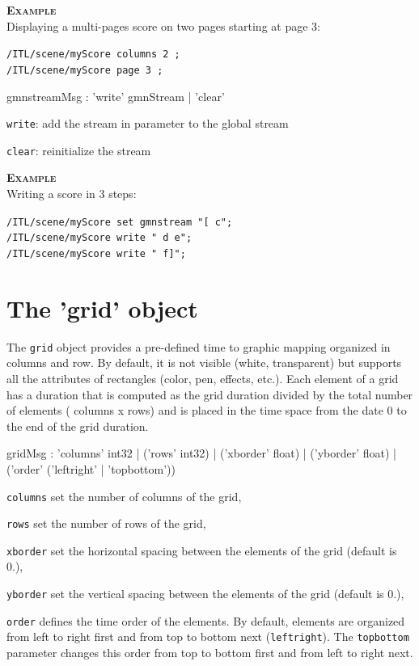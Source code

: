 \documentclass[a4paper,twoside]{report}
\newcommand{\sublevel}[1]	{\section{#1}}
\newcommand{\OSC}[1]		{\texttt{#1}}
\newcommand{\example}		{\textbf{\hspace{-1.5cm}\textbf{\textsc{Example }}}}
\let\olditemize\itemize
\let\oldenditemize\enditemize
\renewenvironment{itemize} 	{\olditemize \setlength{\itemsep}{1mm}}{\oldenditemize}
\newcommand{\sample}	[1]			{\vspace{-2mm}\begin{center}\colorbox{mygrey}{
								\begin{minipage}[t]{0.9\columnwidth} 
								{\small \texttt{#1}}
								\end{minipage}}\end{center}}
\begin{document}
\example \\
Displaying a multi-pages score on two pages starting at page 3:
\sample{/ITL/scene/myScore columns 2 ;\\
/ITL/scene/myScore page 3 ;
}


\begin{rail}
gmnstreamMsg :      'write' gmnStream
				| 'clear' 
\end{rail}

\begin{itemize}
\item \OSC{write}: add the stream in parameter to the global stream
\item \OSC{clear}: reinitialize the stream
\end{itemize}


\example \\
Writing a score in 3 steps:
\sample{/ITL/scene/myScore set gmnstream "[ c"; \\
/ITL/scene/myScore write " d e";\\
/ITL/scene/myScore write " f]";
}


\sublevel{The 'grid' object}
\label{grid}

The \OSC{grid} object provides a pre-defined time to graphic mapping organized in columns and row. By default, it is not visible (white, transparent) but supports all the attributes of rectangles (color, pen, effects, etc.). Each element of a grid has a duration that is computed as the grid duration divided by the total number of elements ( columns x rows) and is placed in the time space from the date 0 to the end of the grid duration.

\begin{rail}
gridMsg : 'columns' int32
		| ('rows' int32) 
		| ('xborder' float)
		| ('yborder' float)
		| ('order' ('leftright' | 'topbottom'))
\end{rail}

\begin{itemize}
\item \OSC{columns} set the number of columns of the grid,
\item \OSC{rows} set the number of rows of the grid,
\item \OSC{xborder} set the horizontal spacing between the elements of the grid (default is 0.),
\item \OSC{yborder} set the vertical spacing between the elements of the grid (default is 0.),
\item \OSC{order} defines the time order of the elements. By default, elements are organized from left to right first and from top to bottom next (\OSC{leftright}). The \OSC{topbottom} parameter changes this order from top to bottom first and from left to right next.
\end{itemize}
\end{document}
